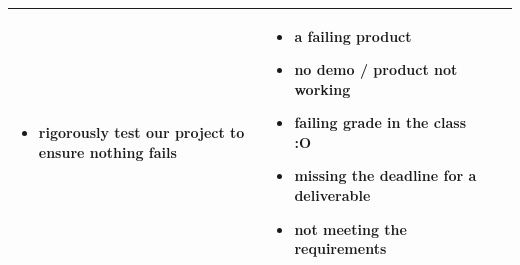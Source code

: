 \documentclass{article}
\begin{document}
\begin{center}
\begin{tabular}{|p{5cm}|p{5cm}|p{5cm}|p{5cm}|}
\begin{itemize}
            \item rigorously test our project to ensure nothing fails
        \end{itemize} &
        \begin{itemize}
            \item a failing product
            \item no demo / product not working
            \item failing grade in the class :O
            \item missing the deadline for a deliverable
            \item not meeting the requirements
        \end{itemize} \\
        \hline
    \end{tabular}
\end{center}
\end{document}
